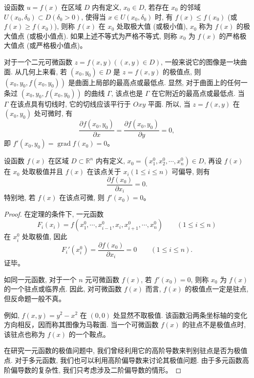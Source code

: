 \documentclass[UTF8,12pt,a4paper,fontset=fandol]{ctexart}
\begin{document}
\begin{definition}\label{course-definition-14-5-1}\quad 设函数 $u=f(x)$ 在区域 $D$ 内有定义, $x_0\in D$, 若存在 $x_0$ 的邻域 $U(x_0,\delta_0)\subset D(\delta_0>0)$, 使得当 $x\in U(x_0,\delta_0)$ 时, 有 $f(x)\leqslant f(x_0)$ (或 $f(x)\geqslant f(x_0)$), 则称 $f(x)$ 在 $x_0$ 处取极大值 (或极小值), $x_0$ 称为 $f(x)$ 的极大值点 (或极小值点). 如果上述不等式为严格不等式, 则称 $x_0$ 为 $f(x)$ 的严格极大值点 (或严格极小值点)。

对于一个二元可微函数 $z=f(x,y)((x,y)\in D)$, 一般来说它的图像是一块曲面. 从几何上来看, 若 $(x_0,y_0)\in D$ 是 $z=f(x,y)$ 的极值点, 则 $(x_0,y_0,f(x_0,y_0))$ 是曲面上局部的最高点或最低点. 显然, 对于曲面上的任何一条过 $(x_0,y_0,f(x_0,y_0))$ 的曲线 $\Gamma$, 该点也是 $\Gamma$ 在它附近的最高点或最低点. 当 $\Gamma$ 在该点具有切线时, 它的切线应该平行于 $Oxy$ 平面. 所以, 当 $z=f(x,y)$ 在 $(x_0,y_0)$ 处可微时, 有
\[
  \frac{\partial f(x_0,y_0)}{\partial x}
  =
  \frac{\partial f(x_0,y_0)}{\partial y}
  =0,
\]
即 $f'(x_0,y_0)=\operatorname{grad} f(x_0)=0$。

\end{definition}
\begin{theorem}\label{course-theorem-14-5-1}\quad 设函数 $f(x)$ 在区域 $D\subset\mathbb R^n$ 内有定义, $x_0=(x_1^0,x_2^0,\cdots,x_n^0)\in D$, 再设 $f(x)$ 在 $x_0$ 处取极值并且 $f(x)$ 在该点关于 $x_i(1\leqslant i\leqslant n)$ 可偏导, 则有
\[
  \frac{\partial f(x_0)}{\partial x_i}=0.
\]
特别地, 若 $f(x)$ 在该点可微, 则 $f'(x_0)=0$。

\end{theorem}
\begin{proof}\quad 在定理的条件下, 一元函数
\[
  F_i(x_i)=f(x_1^0,\cdots,x_{i-1}^0,x_i,x_{i+1}^0,\cdots,x_n^0)
  \qquad (1\leqslant i\leqslant n)
\]
在 $x_i^0$ 处取极值, 因此
\[
  F_i'(x_i^0)=\frac{\partial f(x_0)}{\partial x_i}=0
  \qquad (1\leqslant i\leqslant n).
\]
证毕。

如同一元函数, 对于一个 $n$ 元可微函数 $f(x)$, 若 $f'(x_0)=0$, 则称 $x_0$ 为 $f(x)$ 的一个驻点或临界点. 因此, 对可微函数 $f(x)$ 而言, $f(x)$ 的极值点一定是驻点, 但反命题一般不真。

例如, $f(x,y)=y^2-x^2$ 在 $(0,0)$ 处显然不取极值. 该函数沿两条坐标轴的变化方向相反，因而称其图像为马鞍面. 当一个可微函数 $f(x)$ 的驻点不是极值点时, 该驻点也称为 $f(x)$ 的一个鞍点。

在研究一元函数的极值问题中, 我们曾经利用它的高阶导数来判别驻点是否为极值点. 对于多元函数, 我们也可以利用高阶偏导数来讨论其极值问题. 由于多元函数高阶偏导数的复杂性, 我们只考虑涉及二阶偏导数的情形。

\end{proof}
\end{document}

